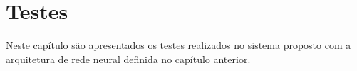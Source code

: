\chapter{ Testes }

Neste capítulo são apresentados os testes realizados no sistema
proposto com a arquitetura de rede neural definida no capítulo
anterior.


